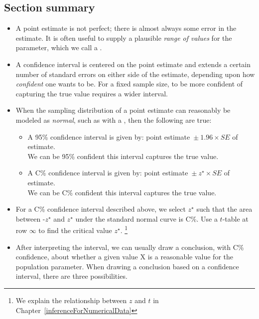 \subsection*{Section summary}
\begin{itemize}
\item A point estimate is not perfect; there is almost always some error in the estimate. It is often useful to supply a plausible \textit{range of values} for the parameter, which we call a .  

\item A confidence interval is centered on the point estimate and extends a certain number of standard errors on either side of the estimate, depending upon how \textit{confident} one wants to be.  For a fixed sample size, to be more confident of capturing the true value requires a wider interval.


\item When the sampling distribution of a point estimate can reasonably be modeled as
\emph{normal}, such as with a , then the following are true:\vspace{-1mm}
\begin{itemize}
\item A 95\% confidence interval is given by:   point estimate\ $\pm\ 1.96 \times SE$ of estimate.
\\We can be 95\% confident this interval captures the true value.
\item A C\% confidence interval is given by:   point estimate\ $\pm\ z^{\star} \times SE$ of estimate.  
\\We can be C\% confident this interval captures the true value.
\end{itemize}

\item For a C\% confidence interval described above, we select $z^{\star}$ such that the area between -$z^{\star}$ and $z^{\star}$ under the standard normal curve is C\%. Use a $t$-table at row $\infty$ to find the critical value $z^{\star}$. \footnote{We explain the relationship between $z$ and $t$ in Chapter~\ref{inferenceForNumericalData}}

\item After interpreting the interval, we can usually draw a conclusion, with C\% confidence, about whether a given value X is a reasonable value for the population parameter.  When drawing a conclusion based on a confidence interval, there are three  possibilities.  


\end{itemize}
